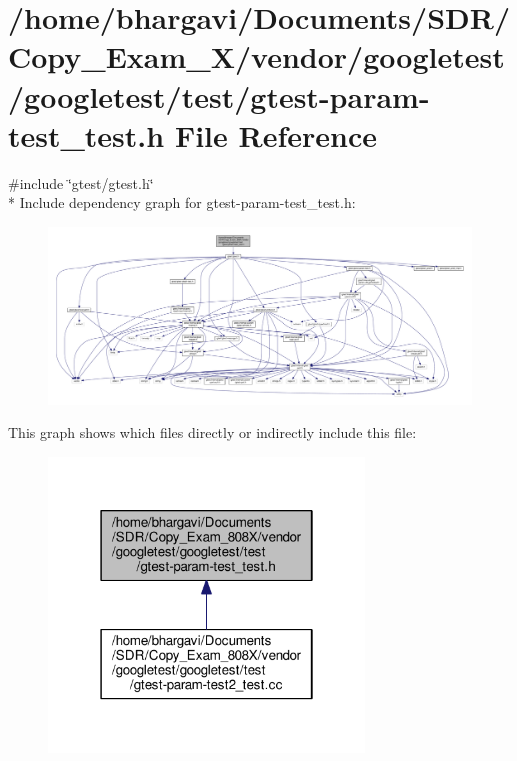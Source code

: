 \hypertarget{gtest-param-test__test_8h}{}\section{/home/bhargavi/\+Documents/\+S\+D\+R/\+Copy\+\_\+\+Exam\+\_\+X/vendor/googletest/googletest/test/gtest-\/param-\/test\+\_\+test.h File Reference}
\label{gtest-param-test__test_8h}
{\ttfamily \#include \char`\"{}gtest/gtest.\+h\char`\"{}}\\*
Include dependency graph for gtest-\/param-\/test\+\_\+test.h\+:
\nopagebreak
\begin{figure}[H]
\begin{center}
\leavevmode
\includegraphics[width=350pt]{gtest-param-test__test_8h__incl}
\end{center}
\end{figure}
This graph shows which files directly or indirectly include this file\+:
\nopagebreak
\begin{figure}[H]
\begin{center}
\leavevmode
\includegraphics[width=238pt]{gtest-param-test__test_8h__dep__incl}
\end{center}
\end{figure}
